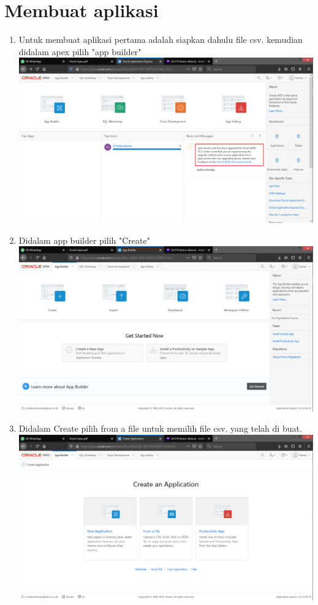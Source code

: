 \documentclass[12pt]{article}
\begin{document}
\section*{Membuat aplikasi}
	\begin{enumerate}
		\item Untuk membuat aplikasi pertama adalah siapkan dahulu file csv. kemudian didalam apex pilih "app builder"\\
		\includegraphics[scale=0.3]{src/6}
		\item Didalam app builder pilih "Create"\\
		\includegraphics[scale=0.3]{src/7}
		\item Didalam Create pilih from a file untuk memilih file csv. yang telah di buat.\\
		\includegraphics[scale=0.3]{src/8}

\end{enumerate}
\end{document}
